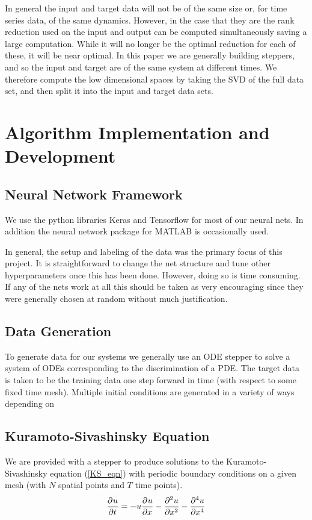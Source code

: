 \documentclass[10pt]{article}
\begin{document}
In general the input and target data will not be of the same size or, for time series data, of the same dynamics. However, in the case that they are the rank reduction used on the input and output can be computed simultaneously saving a large computation. While it will no longer be the optimal reduction for each of these, it will be near optimal. In this paper we are generally building steppers, and so the input and target are of the same system at different times. We therefore compute the low dimensional spaces by taking the SVD of the full data set, and then split it into the input and target data sets.

\section{Algorithm Implementation and Development}

\subsection{Neural Network Framework}
We use the python libraries Keras and Tensorflow for most of our neural nets. In addition the neural network package for MATLAB is occasionally used.

In general, the setup and labeling of the data was the primary focus of this project. It is straightforward to change the net structure and tune other hyperparameters once this has been done. However, doing so is time consuming. If any of the nets work at all this should be taken as very encouraging since they were generally chosen at random without much justification.


\subsection{Data Generation}
To generate data for our systems we generally use an ODE stepper to solve a system of ODEs corresponding to the discrimination of a PDE. The target data is taken to be the training data one step forward in time (with respect to some fixed time mesh). Multiple initial conditions are generated in a variety of ways depending on


\subsection{Kuramoto-Sivashinsky Equation}
We are provided with a stepper to produce solutions to the Kuramoto-Sivashinsky equation (\ref{KS_eqn}) with periodic boundary conditions on a given mesh (with \( N \) spatial points and \( T \) time points).
\begin{align}
    \pp{u}{t} = -u \pp{u}{x} - \pp[2]{u}{x} - \pp[4]{u}{x} \label{KS_eqn}
\end{align}
\end{document}
